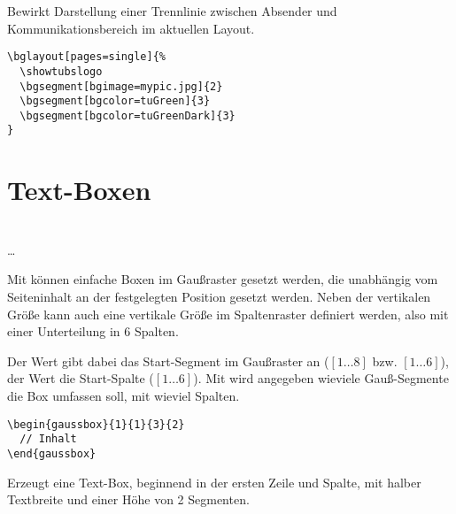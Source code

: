 \vspace*{-5mm}
\begin{Declaration}
\end{Declaration}

Bewirkt Darstellung einer Trennlinie zwischen Absender und Kommunikationsbereich
im aktuellen Layout.

\begin{lstlisting}[captionpos=b,caption={Beispiel-Nutzung von bglayout}]
\bglayout[pages=single]{%
  \showtubslogo
  \bgsegment[bgimage=mypic.jpg]{2}
  \bgsegment[bgcolor=tuGreen]{3}
  \bgsegment[bgcolor=tuGreenDark]{3}
}
\end{lstlisting}


\section{Text-Boxen}

\begin{Declaration}
          \\
  \quad\dots\\
\end{Declaration}

Mit  können einfache Boxen im Gaußraster gesetzt werden,
die unabhängig vom Seiteninhalt an der festgelegten Position gesetzt werden.
Neben der vertikalen Größe kann auch eine vertikale Größe im Spaltenraster
definiert werden, also mit einer Unterteilung in 6 Spalten.

Der Wert  gibt dabei das Start-Segment im Gaußraster an
($[1\ldots 8]$ bzw. $[1\ldots6]$),
der Wert  die Start-Spalte ($[1\ldots6]$).
Mit  wird angegeben wieviele Gauß-Segmente die Box umfassen soll,
mit  wieviel Spalten.

\begin{Example}
  \begin{lstlisting}
\begin{gaussbox}{1}{1}{3}{2}
  // Inhalt
\end{gaussbox}
  \end{lstlisting}
  Erzeugt eine Text-Box, beginnend in der ersten Zeile und Spalte,
  mit halber Textbreite und einer Höhe von 2 Segmenten.
\end{Example}

